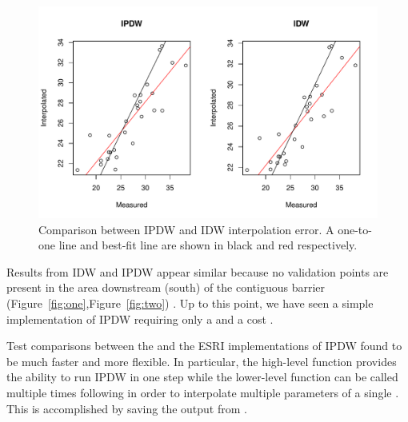 \documentclass[nojss,shortnames]{jss}
\begin{document}
\begin{Schunk}
\end{Schunk}

\begin{figure}[h!]
\begin{center}
\includegraphics{ipdw-figure3}
\end{center}
\vspace{-20pt}
\caption{Comparison between IPDW and IDW interpolation error.  A one-to-one line and best-fit line are shown in black and red respectively.}
\label{fig:three}
\end{figure}
\FloatBarrier

Results from IDW and IPDW appear similar because no validation points are present in the area downstream (south) of the contiguous barrier (Figure~\ref{fig:one},Figure~\ref{fig:two}) . Up to this point, we have seen a simple implementation of IPDW requiring only a  and a cost . 

Test comparisons between the  and the ESRI \citep{mitchell2012,suominen2010} implementations of IPDW found  to be much faster and more flexible. In particular, the high-level function  provides the ability to run IPDW in one step while the lower-level function  can be called multiple times following  in order to interpolate multiple parameters of a single . This is accomplished by saving the output from .

\setlength{\bibsep}{0pt}


\end{document}
